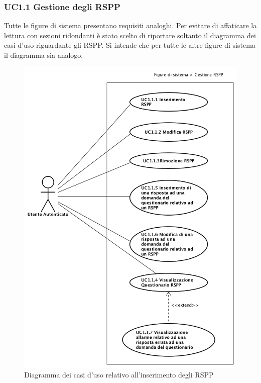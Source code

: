 	\subsubsection{UC1.1 Gestione degli RSPP}
	\label{section:UC1_1}
	Tutte le figure di sistema presentano requisiti analoghi. Per evitare di affaticare la lettura con sezioni ridondanti è stato scelto di riportare soltanto il diagramma dei casi d'uso riguardante gli RSPP. Si intende che per tutte le altre figure di sistema il diagramma sia analogo. 
		\begin{figure}[H]
			\begin{center}
				\includegraphics[width=12cm]{Pics/UC1_1_FigureDiSistema_RSPP.png}
				\caption{Diagramma dei casi d'uso relativo all'inserimento degli RSPP}
				\label{fig:UC1_1RSPP}
			\end{center}
		\end{figure}
